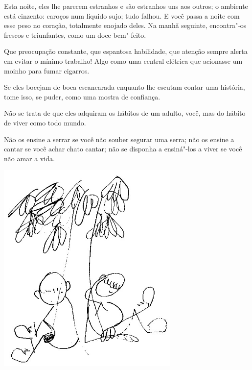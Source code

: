 \bigskip
\bigskip

\pagebreak

Esta noite, eles lhe parecem estranhos e são estranhos uns aos outros; o
ambiente está cinzento: caroços num líquido sujo; tudo falhou. E você
passa a noite com esse peso no coração, totalmente enojado deles. Na
manhã seguinte, encontra"-os frescos e triunfantes, como um doce
bem"-feito.

\bigskip
\bigskip

Que preocupação constante, que espantosa habilidade, que atenção sempre
alerta em evitar o mínimo trabalho! Algo como uma central elétrica que
acionasse um moinho para fumar cigarros.

\bigskip
\bigskip

Se eles bocejam de boca escancarada enquanto lhe escutam contar uma
história, tome isso, se puder, como uma mostra de confiança.

\bigskip
\bigskip

Não se trata de que eles adquiram os hábitos de um adulto, você, mas do
hábito de viver como todo mundo.

\bigskip
\bigskip

Não os ensine a serrar se você não souber segurar uma serra; não os
ensine a cantar se você achar chato cantar; não se disponha a ensiná"-los
a viver se você não amar a vida.

\bigskip
\bigskip

\begin{center}
\includegraphics[width=90mm]{./imgs/Image_8.jpg}
\end{center}

